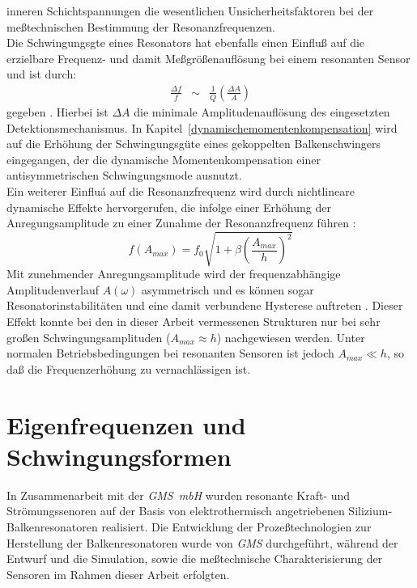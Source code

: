 inneren Schichtspannungen die wesentlichen Unsicherheitsfaktoren bei der
meßtechnischen Bestimmung der Resonanzfrequenzen.\\
Die Schwingungsgte eines Resonators hat ebenfalls einen Einfluß auf die
erzielbare Frequenz- und damit Meßgrößenauflösung bei einem resonanten
Sensor und ist durch:
\begin{eqnarray}
\label{Qaufl}
 \frac{\Delta f}{f} & \sim & \frac{1}{Q} \left( \frac{\Delta A}{A} \right)
\end{eqnarray}
gegeben \cite{Til93}. Hierbei ist $\Delta A$ die minimale
Amplitudenauflösung des eingesetzten Detektionsmechanismus.
In Kapitel~\ref{dynamischemomentenkompensation} wird auf die Erhöhung der
Schwingungsgüte eines gekoppelten Balkenschwingers eingegangen, der die
dynamische Momentenkompensation einer antisymmetrischen Schwingungsmode
ausnutzt.\\
Ein weiterer Einfluá auf die Resonanzfrequenz wird durch nichtlineare
dynamische Effekte hervorgerufen, die infolge einer Erhöhung der
Anregungsamplitude zu einer Zunahme der Resonanzfrequenz führen \cite{Eis64}:
\begin{equation}
\label{nlampli}
 f(A_{max}) = f_{0} \sqrt{1 + \beta \left( \frac{A_{max}}{h} \right)^2 }
\end{equation}
Mit zunehmender Anregungsamplitude wird der frequenzabhängige
Amplitudenverlauf $A(\omega)$ asymmetrisch und es können sogar
Resonatorinstabilitäten und eine damit verbundene Hysterese auftreten
\cite{And87, Zoo92}. Dieser Effekt konnte bei den in dieser Arbeit
vermessenen Strukturen nur bei sehr großen Schwingungsamplituden
($A_{max} \approx h$) nachgewiesen werden. Unter normalen
Betriebsbedingungen bei resonanten Sensoren ist jedoch $A_{max} \ll h$,
so daß die Frequenzerhöhung zu vernachlässigen ist.


\newpage
\section{Eigenfrequenzen und Schwingungsformen}
\label{eigenfrequenzenundschwingungsformen}

In Zusammenarbeit mit der {\em GMS~mbH} wurden resonante Kraft- und
Strömungssenoren auf der Basis von elektrothermisch angetriebenen
Silizium-Balkenresonatoren realisiert. Die Entwicklung der Prozeßtechnologien
zur Herstellung der Balkenresonatoren wurde von {\em GMS} durchgeführt,
während der Entwurf und die Simulation, sowie die meßtechnische
Charakterisierung der Sensoren im Rahmen dieser Arbeit erfolgten.


